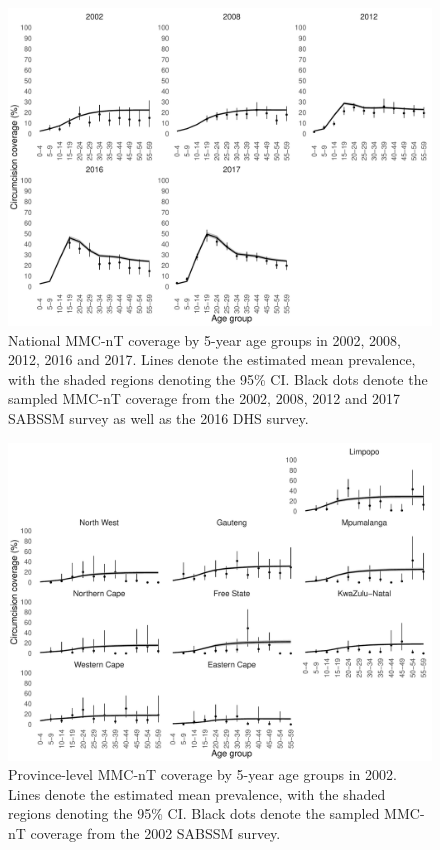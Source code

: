 \documentclass{article}
\begin{document}
\begin{appendix}
\begin{figure}[H]
	\centering
	\includegraphics[width = \linewidth]{Figures/suppmat/ModelFit/MMCnTPrev_5year_National_withsurveypoints}
	\caption{National MMC-nT coverage by 5-year age groups in 2002, 2008, 2012, 2016 and 2017. Lines denote the estimated mean prevalence, with the shaded regions denoting the 95\% CI. Black dots denote the sampled MMC-nT coverage from the 2002, 2008, 2012 and 2017 SABSSM survey as well as the 2016 DHS survey.}
\end{figure}


\begin{figure}[H]
	\centering
	\includegraphics[width = \linewidth]{Figures/suppmat/ModelFit/MMCnTPrev_5year_Province_2002_withsurveypoints}
	\caption{Province-level MMC-nT coverage by 5-year age groups in 2002. Lines denote the estimated mean prevalence, with the shaded regions denoting the 95\% CI. Black dots denote the sampled MMC-nT coverage from the 2002 SABSSM survey.}
\end{figure}


\end{appendix}
\end{document}
